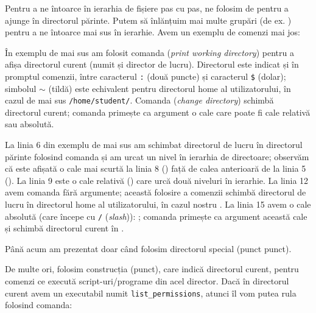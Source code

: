 Pentru a ne întoarce în ierarhia de fișiere pas cu pas, ne folosim de  pentru a ajunge în directorul părinte. Putem să înlănțuim mai multe grupări  (de ex. ) pentru a ne întoarce mai sus în ierarhie. Avem un exemplu de comenzi mai jos:


În exemplu de mai sus am folosit comanda  (\textit{print working directory}) pentru a afișa directorul curent (numit și director de lucru). Directorul este indicat și în promptul comenzii, între caracterul \texttt{:} (două puncte) și caracterul \texttt{\$} (dolar); simbolul \texttt{$\sim$} (tildă) este echivalent pentru directorul home al utilizatorului, în cazul de mai sus \texttt{/home/student/}. Comanda  (\textit{change directory}) schimbă directorul curent; comanda primește ca argument o cale care poate fi cale relativă sau absolută.

La linia 6 din exemplu de mai sus am schimbat directorul de lucru în directorul părinte folosind comanda  și am urcat un nivel în ierarhia de directoare; observăm că este afișată o cale mai scurtă la linia 8 () față de calea anterioară de la linia 5 (). La linia 9 este o cale relativă () care urcă două niveluri în ierarhie. La linia 12 avem comanda  fără argumente; această folosire a comenzii schimbă directorul de lucru în directorul home al utilizatorului, în cazul nostru . La linia 15 avem o cale absolută (care începe cu \texttt{/} (\textit{slash})): ; comanda  primește ca argument această cale și schimbă directorul curent în .

Până acum am prezentat doar când folosim directorul special  (punct punct).

De multe ori, folosim construcția  (punct), care indică directorul curent, pentru comenzi ce
execută script-uri/programe din acel director. Dacă în directorul curent avem un executabil numit \texttt{list_permissions}, atunci îl vom putea rula folosind comanda:

